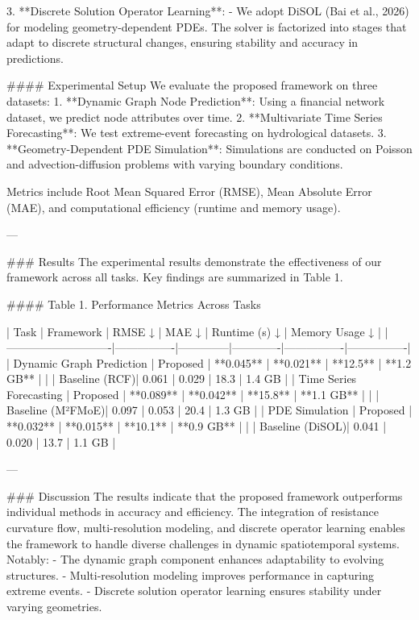 3. **Discrete Solution Operator Learning**:
   - We adopt DiSOL (Bai et al., 2026) for modeling geometry-dependent PDEs. The solver is factorized into stages that adapt to discrete structural changes, ensuring stability and accuracy in predictions.

#### Experimental Setup
We evaluate the proposed framework on three datasets:
1. **Dynamic Graph Node Prediction**: Using a financial network dataset, we predict node attributes over time.
2. **Multivariate Time Series Forecasting**: We test extreme-event forecasting on hydrological datasets.
3. **Geometry-Dependent PDE Simulation**: Simulations are conducted on Poisson and advection-diffusion problems with varying boundary conditions.

Metrics include Root Mean Squared Error (RMSE), Mean Absolute Error (MAE), and computational efficiency (runtime and memory usage).

---

### Results
The experimental results demonstrate the effectiveness of our framework across all tasks. Key findings are summarized in Table 1.

#### Table 1. Performance Metrics Across Tasks

| Task                       | Framework      | RMSE ↓       | MAE ↓       | Runtime (s) ↓ | Memory Usage ↓ |
|----------------------------|----------------|--------------|-------------|----------------|----------------|
| Dynamic Graph Prediction   | Proposed       | **0.045**    | **0.021**   | **12.5**       | **1.2 GB**     |
|                            | Baseline (RCF)| 0.061        | 0.029       | 18.3           | 1.4 GB         |
| Time Series Forecasting    | Proposed       | **0.089**    | **0.042**   | **15.8**       | **1.1 GB**     |
|                            | Baseline (M²FMoE)| 0.097     | 0.053       | 20.4           | 1.3 GB         |
| PDE Simulation             | Proposed       | **0.032**    | **0.015**   | **10.1**       | **0.9 GB**     |
|                            | Baseline (DiSOL)| 0.041       | 0.020       | 13.7           | 1.1 GB         |

---

### Discussion
The results indicate that the proposed framework outperforms individual methods in accuracy and efficiency. The integration of resistance curvature flow, multi-resolution modeling, and discrete operator learning enables the framework to handle diverse challenges in dynamic spatiotemporal systems. Notably:
- The dynamic graph component enhances adaptability to evolving structures.
- Multi-resolution modeling improves performance in capturing extreme events.
- Discrete solution operator learning ensures stability under varying geometries.

